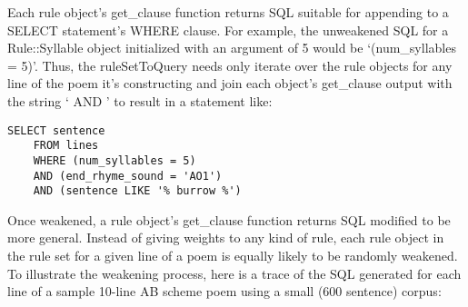 \documentclass[10pt]{article}
\begin{document}
Each rule object's get\_clause function returns SQL suitable for appending to a
SELECT statement's WHERE clause. For example, the unweakened SQL for a
Rule::Syllable object initialized with an argument of 5 would be
`(num\_syllables = 5)'. Thus, the ruleSetToQuery needs only iterate over the
rule objects for any line of the poem it's constructing and join each object's
get\_clause output with the string ` AND ' to result in a statement like:

\begin{verbatim}
SELECT sentence 
    FROM lines 
    WHERE (num_syllables = 5) 
    AND (end_rhyme_sound = 'AO1') 
    AND (sentence LIKE '% burrow %')
\end{verbatim}

Once weakened, a rule object's get\_clause function returns SQL modified to be
more general. Instead of giving weights to any kind of rule, each rule object
in the rule set for a given line of a poem is equally likely to be randomly
weakened. To illustrate the weakening process, here is a trace of the SQL
generated for each line of a sample 10-line AB scheme poem using a small (600
sentence) corpus:
\end{document}
